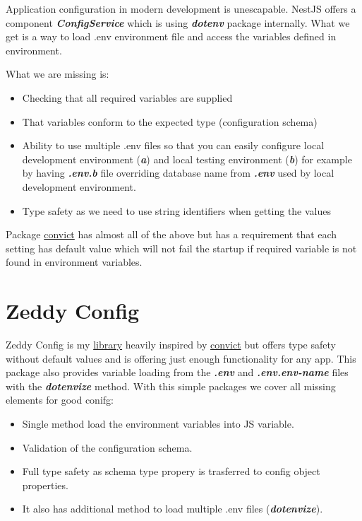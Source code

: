 \documentclass[lang=en,color=green]{elegantbook}
\newcommand{\bi}[1]{\textit{\textbf{#1}}}
\begin{document}
Application configuration in modern development is unescapable. NestJS 
offers a component \bi{ConfigService} which is using \bi{dotenv} package internally.
What we get is a way to load .env environment file and access the variables
defined in environment.

What we are missing is:
\begin{itemize}
    \item Checking that all required variables are supplied
    \item That variables conform to the expected type (configuration schema)
    \item Ability to use multiple .env files so that you can easily configure 
    local development environment (\bi{a}) and local testing environment (\bi{b})
    for example by having \bi{.env.b} file overriding database name from \bi{.env} 
    used by local development environment.
    \item Type safety as we need to use string identifiers when getting the 
    values
\end{itemize}

Package \href{https://www.npmjs.com/package/convict}{convict} has almost all
of the above but has a requirement that each setting has default value 
which will not fail the startup if required variable is not found in 
environment variables.

\section*{Zeddy Config}
Zeddy Config is my \href{https://www.npmjs.com/package/zeddy-config}{library} 
heavily inspired by \href{https://www.npmjs.com/package/convict}{convict} but offers 
type safety without default values and is offering just enough functionality
for any app. This package also provides variable loading from the \bi{.env} 
and \bi{.env.env-name} files with the \bi{dotenvize} method. With this simple
packages we cover all missing elements for good conifg:
\begin{itemize}
    \item Single method load the environment variables into JS variable.
    \item Validation of the configuration schema.
    \item Full type safety as schema type propery is trasferred to config object properties.
    \item It also has additional method to load multiple .env files (\bi{dotenvize}).
\end{itemize}
\end{document}
